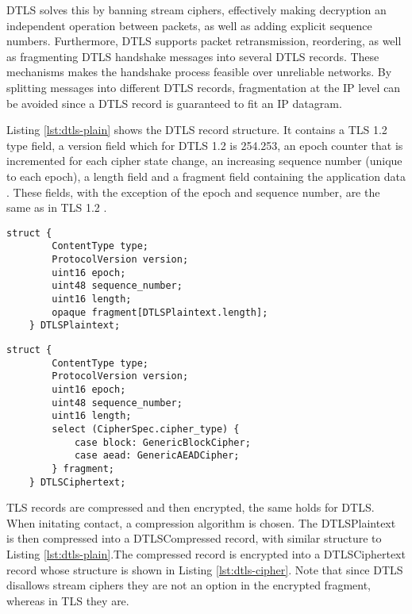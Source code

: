 \documentclass[0-thesis.tex]{subfiles}
\begin{document}
DTLS solves this by banning stream ciphers, effectively making decryption an independent
operation between packets, as well as adding explicit sequence numbers. Furthermore, DTLS
supports packet retransmission, reordering, as well as fragmenting DTLS handshake messages
into several DTLS records. These mechanisms makes the handshake process feasible over
unreliable networks. By splitting messages into different DTLS records, fragmentation at
the IP level can be avoided since a DTLS record is guaranteed to fit an IP datagram.

Listing \ref{lst:dtls-plain} shows the DTLS record structure. It contains a TLS 1.2 type
field, a version field which for DTLS 1.2 is 254.253, an epoch counter that is incremented
for each cipher state change, an increasing sequence number (unique to each epoch), a
length field and a fragment field containing the application data \parencite{rfc5246}.
These fields, with the exception of the epoch and sequence number, are the same 
as in TLS 1.2 \parencite{rfc6347}.

\lstset{language=C}
\begin{lstlisting}[caption={The DTLS plaintext record structure.}, label={lst:dtls-plain}]
    struct {
        ContentType type;
        ProtocolVersion version;
        uint16 epoch;
        uint48 sequence_number;
        uint16 length;
        opaque fragment[DTLSPlaintext.length];
    } DTLSPlaintext;
\end{lstlisting}

\begin{lstlisting}[caption={The DTLS ciphertext record structure.}, label={lst:dtls-cipher}]
    struct {
        ContentType type;
        ProtocolVersion version;
        uint16 epoch;
        uint48 sequence_number;
        uint16 length;
        select (CipherSpec.cipher_type) {
            case block: GenericBlockCipher;
            case aead: GenericAEADCipher;
        } fragment;
    } DTLSCiphertext;
\end{lstlisting}

TLS records are compressed and then encrypted, the same holds for DTLS. When initating
contact, a compression algorithm is chosen. The DTLSPlaintext is then compressed into a
DTLSCompressed record, with similar structure to Listing \ref{lst:dtls-plain}.The
compressed record is encrypted into a DTLSCiphertext record whose structure is shown in
Listing \ref{lst:dtls-cipher}. Note that since DTLS disallows stream ciphers they are not
an option in the encrypted fragment, whereas in TLS they are.
\end{document}
